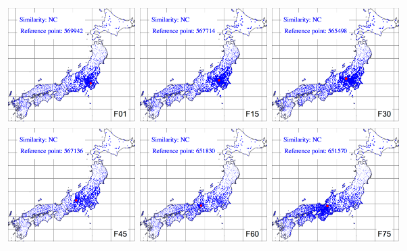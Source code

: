 \documentclass[output=paper]{LSP/langsci}
\begin{document}
\begin{figure}
\includegraphics[width=0.3\textwidth]{illustrations/kuma_fig21-F01}
\includegraphics[width=0.3\textwidth]{illustrations/kuma_fig21-F15}
\includegraphics[width=0.3\textwidth]{illustrations/kuma_fig21-F30}
\\
\includegraphics[width=0.3\textwidth]{illustrations/kuma_fig21-F45}
\includegraphics[width=0.3\textwidth]{illustrations/kuma_fig21-F60}
\includegraphics[width=0.3\textwidth]{illustrations/kuma_fig21-F75}

\end{figure}
\end{document}
